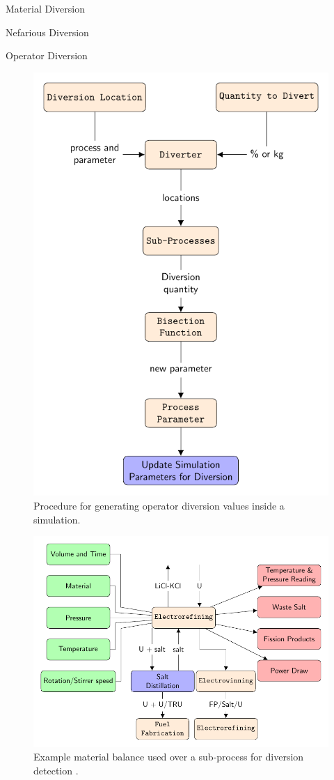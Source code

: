 \documentclass[final]{beamer}
\newlength{\onecolwid}
\newlength{\threecolwid}
\begin{document}
\begin{frame}[t]
\begin{columns}[t,totalwidth=\threecolwid]
\begin{column}{\onecolwid}
\begin{block}{Material Diversion}
\begin{block} {Nefarious Diversion}
	\end{block}
	\begin{block} {Operator Diversion}
		\begin{figure}
			\includegraphics[width=0.8\linewidth]{op-diversion}
			\caption{Procedure for generating operator diversion values inside a simulation.}
		\end{figure}
		\begin{figure}
			\includegraphics[width=\linewidth]{refining}
			\caption{Example material balance used over a sub-process for diversion detection \cite{lee_advanced_2008}.}
		\end{figure}
	\end{block}


\end{block}
\end{column}
\end{columns}
\end{frame}
\end{document}
